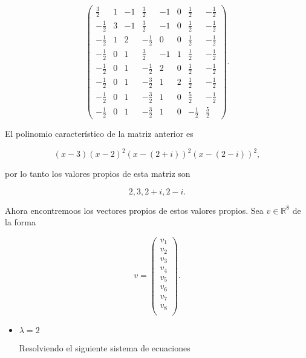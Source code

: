 \documentclass[letterpaper]{article}
\theoremstyle{definition}
\theoremstyle{lemathm}
\theoremstyle{lemademthm}
\newcommand{\pars}[1]{\left( #1 \right) }
\newcommand{\RR}{\mathbb{R}}
\newcommand{\1}{\mathbbm{1}}
\begin{document}
\begin{enumerate}
		\[\pars{\begin{array}{cccccccc} \frac{3}{2} & 1 & -1 & \frac{3}{2} & -1 & 0 & \frac{1}{2} & -\frac{1}{2} \\[1ex] -\frac{1}{2} & 3 & -1 & \frac{3}{2} & -1 & 0 & \frac{1}{2} & -\frac{1}{2} \\[1ex] -\frac{1}{2} & 1 & 2 & -\frac{1}{2} & 0 & 0 & \frac{1}{2} & -\frac{1}{2} \\[1ex] -\frac{1}{2} & 0 & 1 & \frac{3}{2} & -1 & 1 & \frac{1}{2} & -\frac{1}{2} \\[1ex] -\frac{1}{2} & 0 & 1 & -\frac{1}{2} & 2 & 0 & \frac{1}{2} & -\frac{1}{2} \\[1ex] -\frac{1}{2} & 0 & 1 & -\frac{3}{2} & 1 & 2 & \frac{1}{2} & -\frac{1}{2} \\[1ex] -\frac{1}{2} & 0 & 1 & -\frac{3}{2} & 1 & 0 & \frac{5}{2} & -\frac{1}{2} \\[1ex] -\frac{1}{2} & 0 & 1 & -\frac{3}{2} & 1 & 0 & -\frac{1}{2} & \frac{5}{2} \end{array}}.\]

		El polinomio característico de la matriz anterior es

		\[(x-3)(x-2)^2\pars{x-\pars{2+i}}^2\pars{x-\pars{2-i}}^2,\]

		por lo tanto los valores propios de esta matriz son

		\[2,3,2+i,2-i.\]

		Ahora encontremoos los vectores propios de estos valores propios. Sea $v \in \RR^8$ de la forma

		\[v = \pars{\begin{array}{c}
			v_1\\[1ex]
			v_2\\[1ex]
			v_3\\[1ex]
			v_4\\[1ex]
			v_5\\[1ex]
			v_6\\[1ex]
			v_7\\[1ex]
			v_8\\
		\end{array}}.\]

		\begin{itemize}
			\item $\lambda = 2$
			
			Resolviendo el siguiente sistema de ecuaciones
			

\end{itemize}
\end{enumerate}
\end{document}
